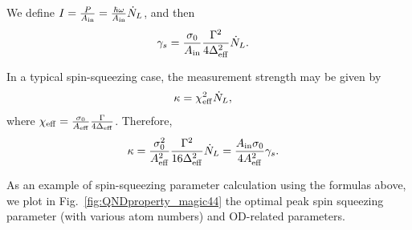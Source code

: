 We define $ I=\frac{P}{A_{\rm in}}= \frac{\hbar \omega }{A_{\rm in}} \dot{N}_L $, and then
\begin{align}
\gamma_s &= \frac{\sigma_0 }{A_{\rm in}} \frac{\Gamma^2}{4\Delta_{\rm eff}^2}\dot{N}_L.
\end{align}

In a typical spin-squeezing case, the measurement strength may be given by
\begin{align}
\kappa &= \chi_{\rm eff}^2 \dot{N}_L,
\end{align} 
where $ \chi_{\rm eff}= \frac{\sigma_0}{A_{\rm eff}} \frac{\Gamma}{4\Delta_{\rm eff}} $.
Therefore,
\begin{align}
\kappa &= \frac{\sigma_0^2}{A_{\rm eff}^2} \frac{\Gamma^2}{16 \Delta_{\rm eff}^2} \dot{N}_L 
= \frac{A_{\rm in}\sigma_0}{4 A_{\rm eff}^2}\gamma_s.
\end{align}


As an example of spin-squeezing parameter calculation using the formulas above, we plot in Fig.~\ref{fig:QNDproperty_magic44} the optimal peak spin squeezing parameter (with various atom numbers) and OD-related parameters.

